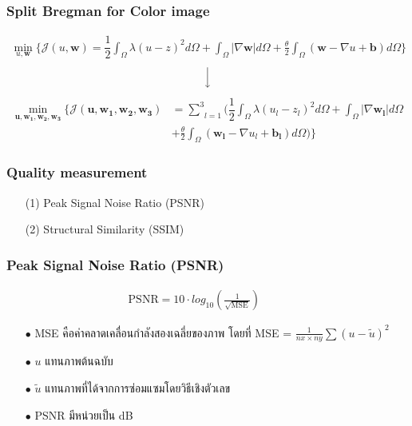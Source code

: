 \documentclass[xcolor=dvipsnames, xetex,serif]{beamer}
\begin{document}
    \begin{frame}
    \frametitle{Split Bregman for Color image}
        \begin{align*}
        \min_{u,\boldsymbol{w}} \{ \mathcal{J}(u,\boldsymbol{w}) = \dfrac{1}{2} \int_{\Omega} \lambda(u-z)^2 d\Omega +  \int_{\Omega}  |\nabla \boldsymbol{w}|  d\Omega + \frac{\theta}{2} \int_{\Omega} (\boldsymbol{w} - \nabla u + \boldsymbol{b}) d\Omega \}
        \end{align*}
        \begin{align*}
        \Big \downarrow
        \end{align*}
        \begin{align*}
        \min_{\boldsymbol{u},\boldsymbol{w_1},\boldsymbol{w_2},\boldsymbol{w_3}} \{ \mathcal{J}(\boldsymbol{u},\boldsymbol{w_1},\boldsymbol{w_2},\boldsymbol{w_3}) &= \underset{l=1}{\overset{3}{\sum}} (  \dfrac{1}{2} \int_{\Omega} \lambda(u_l-z_l)^2 d\Omega +  \int_{\Omega}  |\nabla \boldsymbol{w_l}|  d\Omega \\ &+ \frac{\theta}{2} \int_{\Omega} (\boldsymbol{w_l} - \nabla u_l+ \boldsymbol{b_l}) d\Omega ) \}
        \end{align*}
    \end{frame}
    \begin{frame}
        \frametitle{Quality measurement}
        \begin{itemize}
            \item[(1)] Peak Signal Noise Ratio (PSNR)
            \item[(2)] Structural Similarity (SSIM)
        \end{itemize}
    \end{frame}
    \begin{frame}
        \frametitle{Peak Signal Noise Ratio (PSNR)}
        \begin{align*}
        \text{PSNR}  = 10 \cdot log_{10} ( \frac{1}{\sqrt{\text{MSE}}} )  \hspace{1cm}
        \end{align*}
        \begin{itemize}
            \item[$\bullet$] MSE คือค่าคลาดเคลื่อนกำลังสองเฉลี่ยของภาพ โดยที่ MSE = $\frac{1}{nx \times ny} \sum (u - \tilde{u})^2 $
            \item[$\bullet$] $u$ แทนภาพต้นฉบับ
            \item[$\bullet$] $\tilde{u}$  แทนภาพที่ได้จากการซ่อมแซมโดยวิธีเชิงตัวเลข
            \item[$\bullet$] PSNR มีหน่วยเป็น dB
        \end{itemize}
    \end{frame}
\end{document}
